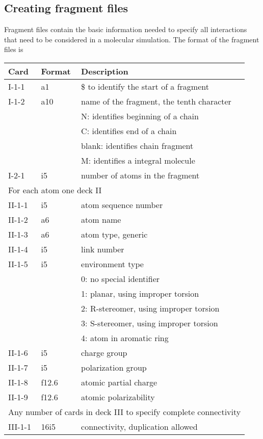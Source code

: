 \subsection{Creating fragment files}
Fragment files contain the basic information needed to specify all
interactions that need to be considered in a molecular simulation.
The format of the fragment files is
\begin{center}
\begin{tabular}{lll}
\hline\hline
Card & Format & Description \\ \hline
I-1-1  & a1     & \$ to identify the start of a fragment \\  %
I-1-2  & a10    & name of the fragment, the tenth character\\
       &        & N: identifies beginning of a chain\\
       &        & C: identifies end of a chain\\
       &        & blank: identifies chain fragment\\
       &        & M: identifies a integral molecule\\
\hline
I-2-1  & i5     & number of atoms in the fragment\\ 
\hline
\multicolumn{3}{l}{For each atom one deck II} \\
\hline
II-1-1 & i5     & atom sequence number \\
II-1-2 & a6     & atom name \\
II-1-3 & a6     & atom type, generic \\
II-1-4 & i5     & link number\\
II-1-5 & i5     & environment type\\
       &        & 0: no special identifier\\
       &        & 1: planar, using improper torsion\\
       &        & 2: R-stereomer, using improper torsion\\
       &        & 3: S-stereomer, using improper torsion\\
       &        & 4: atom in aromatic ring\\
II-1-6 & i5     & charge group\\
II-1-7 & i5     & polarization group\\
II-1-8 & f12.6  & atomic partial charge\\
II-1-9 & f12.6  & atomic polarizability\\
\hline
\multicolumn{3}{l}{Any number of cards in deck III to specify complete 
connectivity} \\
\hline
III-1-1  & 16i5   & connectivity, duplication allowed\\ 
\hline\hline
\end{tabular}
\end{center}
